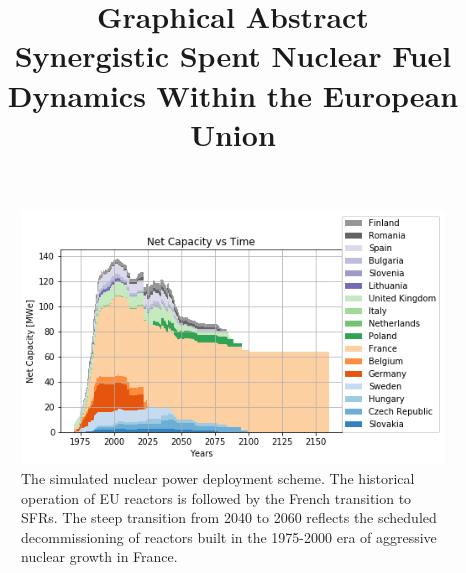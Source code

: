 \documentclass[review]{elsarticle}
\begin{document}
\begin{frontmatter}
\title{Graphical Abstract\\
Synergistic Spent Nuclear Fuel Dynamics Within the European Union}
\date{}                     %

\end{frontmatter}





\begin{figure}[htbp!]
    \begin{center}
        \includegraphics[width=\textwidth]{./onesim.png}
    \end{center}
    \caption{The simulated nuclear power deployment scheme. The historical operation of EU reactors is followed by the French transition to SFRs.  The steep transition from 2040 to 2060 reflects the scheduled decommissioning of reactors built in the 1975-2000 era of aggressive nuclear growth in France.}
    \label{fig:tot_dep}
\end{figure}
\end{document}
